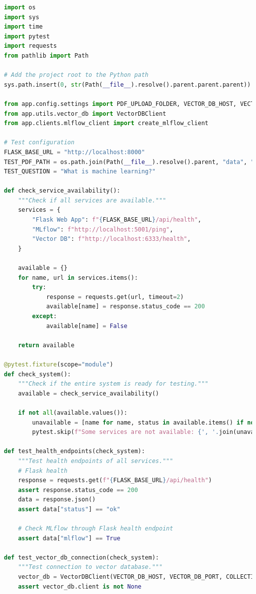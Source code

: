 \documentclass[
  screen,review,acmlarge]{acmart}
\begin{document}
\begin{lstlisting}[language=Python]
import os
import sys
import time
import pytest
import requests
from pathlib import Path

# Add the project root to the Python path
sys.path.insert(0, str(Path(__file__).resolve().parent.parent.parent))

from app.config.settings import PDF_UPLOAD_FOLDER, VECTOR_DB_HOST, VECTOR_DB_PORT, COLLECTION_NAME
from app.utils.vector_db import VectorDBClient
from app.clients.mlflow_client import create_mlflow_client

# Test configuration
FLASK_BASE_URL = "http://localhost:8000"
TEST_PDF_PATH = os.path.join(Path(__file__).resolve().parent, "data", "sample.pdf")
TEST_QUESTION = "What is machine learning?"

def check_service_availability():
    """Check if all services are available."""
    services = {
        "Flask Web App": f"{FLASK_BASE_URL}/api/health",
        "MLflow": f"http://localhost:5001/ping",
        "Vector DB": f"http://localhost:6333/health",
    }
    
    available = {}
    for name, url in services.items():
        try:
            response = requests.get(url, timeout=2)
            available[name] = response.status_code == 200
        except:
            available[name] = False
    
    return available

@pytest.fixture(scope="module")
def check_system():
    """Check if the entire system is ready for testing."""
    available = check_service_availability()
    
    if not all(available.values()):
        unavailable = [name for name, status in available.items() if not status]
        pytest.skip(f"Some services are not available: {', '.join(unavailable)}")

def test_health_endpoints(check_system):
    """Test health endpoints of all services."""
    # Flask health
    response = requests.get(f"{FLASK_BASE_URL}/api/health")
    assert response.status_code == 200
    data = response.json()
    assert data["status"] == "ok"
    
    # Check MLflow through Flask health endpoint
    assert data["mlflow"] == True

def test_vector_db_connection(check_system):
    """Test connection to vector database."""
    vector_db = VectorDBClient(VECTOR_DB_HOST, VECTOR_DB_PORT, COLLECTION_NAME, 384)
    assert vector_db.client is not None
    

\end{lstlisting}
\end{document}
